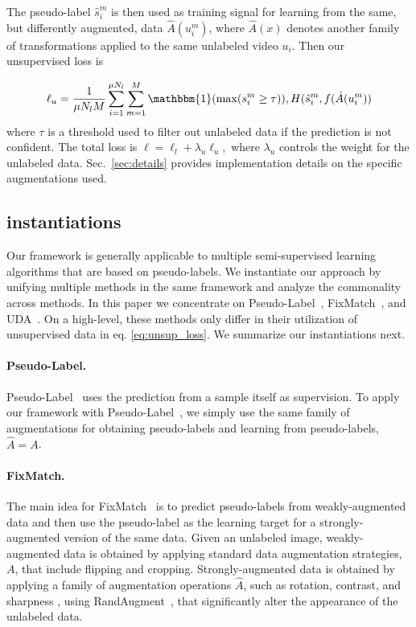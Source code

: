 \documentclass[10pt,twocolumn,letterpaper]{article}
\begin{document}
The pseudo-label $\hat{s}_i^m$ is then used as training signal for learning from the same, but differently augmented, data $\hat{A}(u_i^m)$, where $\hat{A}(x)$ denotes another family of transformations applied to the same unlabeled video $u_i$. Then our unsupervised loss is 

\begin{equation}
	\label{eq:unsup_loss}
	\ell_u = \frac{1}{\mu N_l M}\sum_{i=1}^{\mu N_l} \sum_{m=1}^{M} \mathbbm{1}  (\max(s_i^m\ge \tau)), H(\hat{s}_i^m,f(\hat{A}(u_i^m))
\end{equation}
where $\tau$ is a threshold used to filter out unlabeled data if the prediction is not confident. The total loss is $\ell = \ell_l  + \lambda_u \ell_u,$ where $\lambda_u$ controls the weight for the unlabeled data. {Sec.~\ref{sec:details} provides implementation details on the specific augmentations used.}


\subsection{\oursshort instantiations} \label{sec:multiview_instantiations}
 Our \oursshort framework is generally applicable to multiple semi-supervised learning algorithms that are based on pseudo-labels.
We instantiate our approach by unifying multiple methods in the same framework and analyze the commonality across methods. In this paper we concentrate on Pseudo-Label~\cite{lee2013pseudo},  FixMatch~\cite{fixmatch}, and UDA~\cite{uda}. On a high-level, these methods only differ in their utilization of unsupervised data in eq. \eqref{eq:unsup_loss}. We summarize our instantiations next. 



\paragraph{Pseudo-Label.} Pseudo-Label~\cite{lee2013pseudo} uses the prediction from a sample itself as supervision.
 To apply our framework with Pseudo-Label~\cite{lee2013pseudo}, {we} simply use the same family of augmentations for obtaining pseudo-labels and learning from pseudo-labels, \ie $\hat{A}=A$.


\paragraph{FixMatch.} The main idea for FixMatch~\cite{fixmatch} is to predict pseudo-labels from weakly-augmented data and then use the pseudo-label as the learning target for a strongly-augmented version of the same data.
{Given an unlabeled {image},}
weakly-augmented data is obtained by applying standard data augmentation strategies, $A$,
that include flipping and cropping.
Strongly-augmented data is obtained by applying a family of augmentation operations $\hat{A}$, such as rotation, contrast, and sharpness \etc, using RandAugment~\cite{randaug}, that significantly alter the appearance of the unlabeled data.
\end{document}
